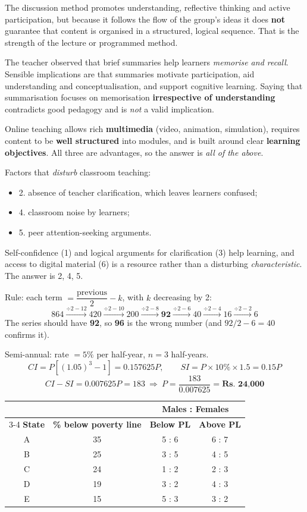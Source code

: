 The discussion method promotes understanding, reflective thinking and active participation, but because it follows the flow of the group's ideas it does \textbf{not} guarantee that content is organised in a structured, logical sequence. That is the strength of the lecture or programmed method.

The teacher observed that brief summaries help learners \emph{memorise and recall}. Sensible implications are that summaries motivate participation, aid understanding and conceptualisation, and support cognitive learning. Saying that summarisation focuses on memorisation \textbf{irrespective of understanding} contradicts good pedagogy and is \emph{not} a valid implication.

Online teaching allows rich \textbf{multimedia} (video, animation, simulation), requires content to be \textbf{well structured} into modules, and is built around clear \textbf{learning objectives}. All three are advantages, so the answer is \emph{all of the above}.

Factors that \emph{disturb} classroom teaching:
\begin{itemize}
\item 2. absence of teacher clarification, which leaves learners confused;
\item 4. classroom noise by learners;
\item 5. peer attention-seeking arguments.
\end{itemize}
Self-confidence (1) and logical arguments for clarification (3) help learning, and access to digital material (6) is a resource rather than a disturbing \emph{characteristic}. The answer is 2, 4, 5.

Rule: each term $=\dfrac{\text{previous}}{2}-k$, with $k$ decreasing by 2:
\[864\xrightarrow{\div2-12}420\xrightarrow{\div2-10}200\xrightarrow{\div2-8}\mathbf{92}\xrightarrow{\div2-6}40\xrightarrow{\div2-4}16\xrightarrow{\div2-2}6\]
The series should have \textbf{92}, so \textbf{96} is the wrong number (and $92/2-6=40$ confirms it).

Semi-annual: rate $=5\%$ per half-year, $n=3$ half-years.
\[CI=P[(1.05)^3-1]=0.157625P,\qquad SI=P\times10\%\times1.5=0.15P\]
\[CI-SI=0.007625P=183\ \Rightarrow\ P=\frac{183}{0.007625}=\textbf{Rs.\ 24{,}000}\]

\small
\begin{tabular}{c c cc}\toprule
& & \multicolumn{2}{c}{\textbf{Males : Females}}\\\cmidrule(l){3-4}
\textbf{State} & \textbf{\% below poverty line} & \textbf{Below PL} & \textbf{Above PL}\\\midrule
A & 35 & 5 : 6 & 6 : 7\\ B & 25 & 3 : 5 & 4 : 5\\ C & 24 & 1 : 2 & 2 : 3\\ D & 19 & 3 : 2 & 4 : 3\\ E & 15 & 5 : 3 & 3 : 2\\\bottomrule
\end{tabular}

